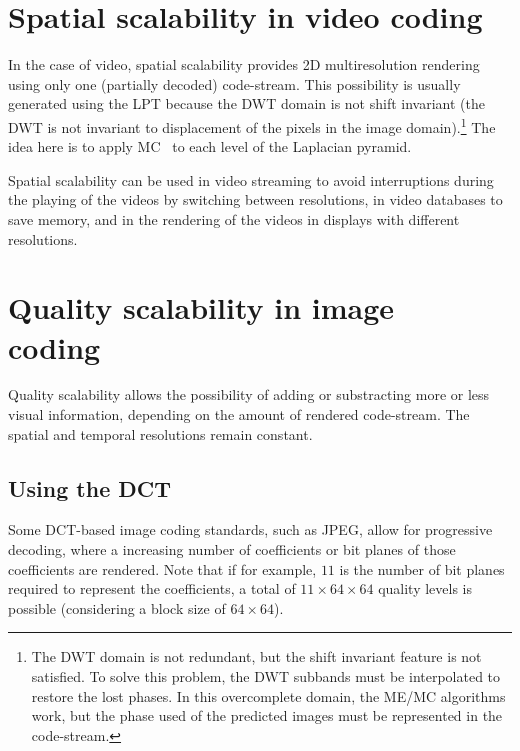 
\section{Spatial scalability in video coding~\cite{vruiz__video_scalability}}


In the case of video, spatial scalability provides 2D multiresolution
rendering using only one (partially decoded) code-stream. This
possibility is usually generated using the LPT because the DWT domain
is not shift invariant (the DWT is not invariant to displacement of
the pixels in the image domain).\footnote{The DWT domain is not
  redundant, but the shift invariant feature is not satisfied. To
  solve this problem, the DWT subbands must be interpolated to restore
  the lost phases. In this overcomplete domain, the ME/MC algorithms
  work, but the phase used of the predicted images must be represented
  in the code-stream.} The idea here is to apply
MC~\cite{vruiz__MC} to each level of the Laplacian pyramid.

Spatial scalability can be used in video streaming to avoid
interruptions during the playing of the videos by switching between
resolutions, in video databases to save memory, and in the rendering
of the videos in displays with different resolutions.


\section{Quality scalability in image coding~\cite{vruiz__JPEG2000}}


Quality scalability allows the possibility of adding or substracting
more or less visual information, depending on the amount of rendered
code-stream. The spatial and temporal resolutions remain constant.

\subsection{Using the DCT}

Some DCT-based image coding standards, such as JPEG, allow for
progressive decoding, where a increasing number of coefficients or bit
planes of those coefficients are rendered. Note that if for example,
$11$ is the number of bit planes required to represent the
coefficients, a total of $11\times 64\times 64$ quality levels is
possible (considering a block size of $64\times 64$).

